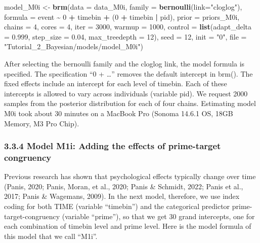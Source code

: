 \documentclass[
  man, donotrepeattitle,floatsintext]{apa6}
\newenvironment{Shaded}{\begin{snugshade}}{\end{snugshade}}
\newcommand{\AttributeTok}[1]{\textcolor[rgb]{0.13,0.29,0.53}{#1}}
\newcommand{\DecValTok}[1]{\textcolor[rgb]{0.00,0.00,0.81}{#1}}
\newcommand{\FloatTok}[1]{\textcolor[rgb]{0.00,0.00,0.81}{#1}}
\newcommand{\FunctionTok}[1]{\textcolor[rgb]{0.13,0.29,0.53}{\textbf{#1}}}
\newcommand{\NormalTok}[1]{#1}
\newcommand{\OtherTok}[1]{\textcolor[rgb]{0.56,0.35,0.01}{#1}}
\newcommand{\SpecialCharTok}[1]{\textcolor[rgb]{0.81,0.36,0.00}{\textbf{#1}}}
\newcommand{\StringTok}[1]{\textcolor[rgb]{0.31,0.60,0.02}{#1}}
\begin{document}
\begin{Shaded}
\begin{Highlighting}[]
\NormalTok{model\_M0i }\OtherTok{\textless{}{-}}                    
   \FunctionTok{brm}\NormalTok{(}\AttributeTok{data =}\NormalTok{ data\_M0i,}
       \AttributeTok{family =} \FunctionTok{bernoulli}\NormalTok{(}\AttributeTok{link=}\StringTok{"cloglog"}\NormalTok{),}
       \AttributeTok{formula =}\NormalTok{ event }\SpecialCharTok{\textasciitilde{}} \DecValTok{0} \SpecialCharTok{+}\NormalTok{ timebin }\SpecialCharTok{+}\NormalTok{ (}\DecValTok{0} \SpecialCharTok{+}\NormalTok{ timebin }\SpecialCharTok{|}\NormalTok{ pid),}
       \AttributeTok{prior =}\NormalTok{ priors\_M0i,}
       \AttributeTok{chains =} \DecValTok{4}\NormalTok{, }\AttributeTok{cores =} \DecValTok{4}\NormalTok{, }
       \AttributeTok{iter =} \DecValTok{3000}\NormalTok{, }\AttributeTok{warmup =} \DecValTok{1000}\NormalTok{,}
       \AttributeTok{control =} \FunctionTok{list}\NormalTok{(}\AttributeTok{adapt\_delta =} \FloatTok{0.999}\NormalTok{, }
                      \AttributeTok{step\_size =} \FloatTok{0.04}\NormalTok{, }
                      \AttributeTok{max\_treedepth =} \DecValTok{12}\NormalTok{),}
       \AttributeTok{seed =} \DecValTok{12}\NormalTok{, }\AttributeTok{init =} \StringTok{"0"}\NormalTok{,}
       \AttributeTok{file =} \StringTok{"Tutorial\_2\_Bayesian/models/model\_M0i"}\NormalTok{)}
\end{Highlighting}
\end{Shaded}

After selecting the bernoulli family and the cloglog link, the model formula is specified. The specification ``0 + \ldots{}'' removes the default intercept in brm(). The fixed effects include an intercept for each level of timebin. Each of these intercepts is allowed to vary across individuals (variable pid). We request 2000 samples from the posterior distribution for each of four chains. Estimating model M0i took about 30 minutes on a MacBook Pro (Sonoma 14.6.1 OS, 18GB Memory, M3 Pro Chip).

\subsubsection{3.3.4 Model M1i: Adding the effects of prime-target congruency}\label{model-m1i-adding-the-effects-of-prime-target-congruency}

Previous research has shown that psychological effects typically change over time (Panis, 2020; Panis, Moran, et al., 2020; Panis \& Schmidt, 2022; Panis et al., 2017; Panis \& Wagemans, 2009). In the next model, therefore, we use index coding for both TIME (variable ``timebin'') and the categorical predictor prime-target-congruency (variable ``prime''), so that we get 30 grand intercepts, one for each combination of timebin level and prime level. Here is the model formula of this model that we call ``M1i''.
\end{document}
